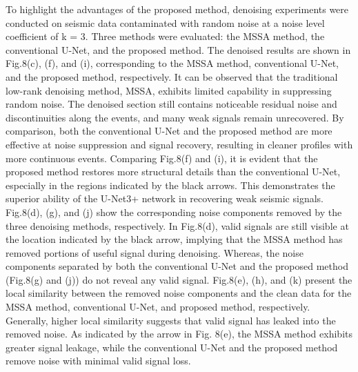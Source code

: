 \documentclass[preprint,12pt]{elsarticle}
\begin{document}
To highlight the advantages of the proposed method, denoising experiments were conducted on seismic data contaminated with random noise at a noise level coefficient of k = 3. Three methods were evaluated: the MSSA method, the conventional U-Net, and the proposed method. The denoised results are shown in Fig.8(c), (f), and (i), corresponding to the MSSA method, conventional U-Net, and the proposed method, respectively. It can be observed that the traditional low-rank denoising method, MSSA, exhibits limited capability in suppressing random noise. The denoised section still contains noticeable residual noise and discontinuities along the events, and many weak signals remain unrecovered. By comparison, both the conventional U-Net and the proposed method are more effective at noise suppression and signal recovery, resulting in cleaner profiles with more continuous events. Comparing Fig.8(f) and (i), it is evident that the proposed method restores more structural details than the conventional U-Net, especially in the regions indicated by the black arrows. This demonstrates the superior ability of the U-Net3+ network in recovering weak seismic signals. Fig.8(d), (g), and (j) show the corresponding noise components removed by the three denoising methods, respectively. In Fig.8(d), valid signals are still visible at the location indicated by the black arrow, implying that the MSSA method has removed portions of useful signal during denoising. Whereas, the noise components separated by both the conventional U-Net and the proposed method (Fig.8(g) and (j)) do not reveal any valid signal. Fig.8(e), (h), and (k) present the local similarity between the removed noise components and the clean data for the MSSA method, conventional U-Net, and proposed method, respectively. Generally, higher local similarity suggests that valid signal has leaked into the removed noise. As indicated by the arrow in Fig. 8(e), the MSSA method exhibits greater signal leakage, while the conventional U-Net and the proposed method remove noise with minimal valid signal loss.
\end{document}
